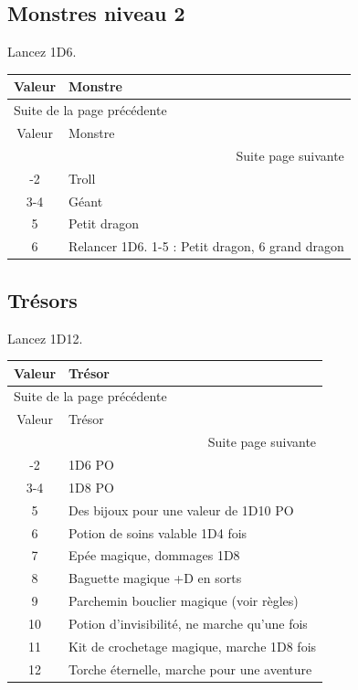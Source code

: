 \documentclass[a4paper, 11pt, twoside]{article}
\begin{document}
\subsection{Monstres niveau 2}
\label{sec:org52f13e7}

Lancez 1D6.

\begin{longtable}{c|l}
Valeur & Monstre\\
\hline
\endfirsthead
\multicolumn{2}{l}{Suite de la page précédente} \\
\hline

Valeur & Monstre \\

\hline
\endhead
\hline\multicolumn{2}{r}{Suite page suivante} \\
\endfoot
\endlastfoot
\hline
1-2 & Troll\\
3-4 & Géant\\
5 & Petit dragon\\
6 & Relancer 1D6. 1-5 : Petit dragon, 6 grand dragon\\
\end{longtable}


\subsection{Trésors}
\label{sec:org49946f3}

Lancez 1D12.

\begin{longtable}{c|l}
Valeur & Trésor\\
\hline
\endfirsthead
\multicolumn{2}{l}{Suite de la page précédente} \\
\hline

Valeur & Trésor \\

\hline
\endhead
\hline\multicolumn{2}{r}{Suite page suivante} \\
\endfoot
\endlastfoot
\hline
1-2 & 1D6 PO\\
3-4 & 1D8 PO\\
5 & Des bijoux pour une valeur de 1D10 PO\\
6 & Potion de soins valable 1D4 fois\\
7 & Epée magique, dommages 1D8\\
8 & Baguette magique +D en sorts\\
9 & Parchemin bouclier magique (voir règles)\\
10 & Potion d'invisibilité, ne marche qu'une fois\\
11 & Kit de crochetage magique, marche 1D8 fois\\
12 & Torche éternelle, marche pour une aventure\\
\end{longtable}
\end{document}
